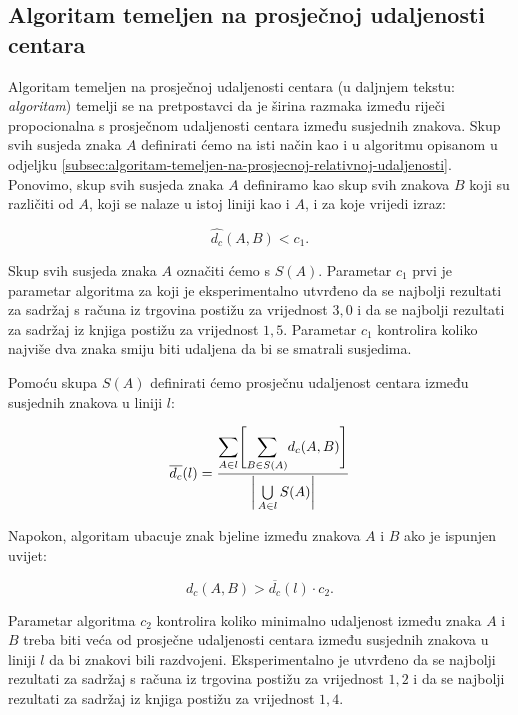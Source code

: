 \documentclass[times, utf8, zavrsni]{fer}
\begin{document}
\subsection{Algoritam temeljen na prosječnoj udaljenosti centara}
Algoritam temeljen na prosječnoj udaljenosti centara (u daljnjem tekstu:
\emph{algoritam}) temelji se na pretpostavci da je širina razmaka između riječi
propocionalna s prosječnom udaljenosti centara između susjednih znakova.
Skup svih susjeda znaka $A$ definirati ćemo na isti način kao i u algoritmu
opisanom u odjeljku
\ref{subsec:algoritam-temeljen-na-prosjecnoj-relativnoj-udaljenosti}. Ponovimo,
skup svih susjeda znaka $A$ definiramo kao skup svih znakova $B$ koji su
različiti od $A$, koji se nalaze u istoj liniji kao i $A$, i za koje vrijedi
izraz:

\begin{equation}
\hat{d_c}(A, B) < c_1 \texttt{.}
\end{equation}

Skup svih susjeda znaka $A$ označiti ćemo s $S(A)$. Parametar $c_1$ prvi je
parametar algoritma za koji je eksperimentalno utvrđeno
da se najbolji rezultati za sadržaj s računa iz trgovina postižu za vrijednost
$3{,}0$ i da se najbolji rezultati za sadržaj iz knjiga postižu za vrijednost
$1{,}5$. Parametar $c_1$ kontrolira koliko najviše dva znaka smiju biti udaljena
da bi se smatrali susjedima.

Pomoću skupa $S(A)$ definirati ćemo prosječnu udaljenost centara između
susjednih znakova u liniji $l$:

\begin{equation}
\overline{d_c}(l) =
\frac{
    \mathlarger{\sum}\limits_{A \in l}
    \Bigg[
    \mathlarger{\sum}\limits_{B \in S(A)} d_c(A, B)
    \Bigg]
}
{\bigg|\bigcup\limits_{A \in l} S(A)\bigg|}
\end{equation}

Napokon, algoritam ubacuje znak bjeline između znakova $A$ i $B$ ako je ispunjen
uvijet:

\begin{equation}
d_c(A, B) > \overline{d_c}(l) \cdot c_2 \texttt{.}
\end{equation}

Parametar algoritma $c_2$ kontrolira koliko minimalno udaljenost između znaka
$A$ i $B$ treba biti veća od prosječne udaljenosti centara između susjednih
znakova u liniji $l$ da bi znakovi bili razdvojeni. Eksperimentalno je utvrđeno
da se najbolji rezultati za sadržaj s računa iz trgovina postižu za vrijednost
$1{,}2$ i da se najbolji rezultati za sadržaj iz knjiga postižu za vrijednost
$1{,}4$.
\end{document}
